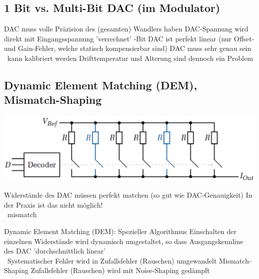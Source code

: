 \subsection{1 Bit vs. Multi-Bit DAC (im Modulator)}

\begin{outline}
    \1 DAC muss volle Präzision des (gesamten) Wandlers haben
        \2 DAC-Spannung wird direkt mit Eingangsspannung 'verrechnet'
    -Bit DAC ist perfekt linear (nur Offset- und Gain-Fehler, welche statisch kompensierbar sind)
    \1 DAC muss sehr genau sein \textrightarrow\ kann kalibriert werden
        \2 Drifttemperatur und Alterung sind dennoch ein Problem
\end{outline}


\subsection{Dynamic Element Matching (DEM), Mismatch-Shaping}

\begin{minipage}[c]{0.4\columnwidth}
    \includegraphics[width=\columnwidth]{images/strom-DAC.png}
\end{minipage}
\hfill
\begin{minipage}[c]{0.58\columnwidth}
    \begin{outline}
        \1 Widerstände des DAC müssen perfekt matchen (so gut wie DAC-Genauigkeit)
            \2 In der Praxis ist das nicht möglich!\\
                \textrightarrow\ mismatch
    \end{outline}
\end{minipage}

\vspace{0.2cm}

\begin{outline}
    \1 Dynamic Element Matching (DEM): Spezieller Algorithmus
        \2 Einschalten der einzelnen Widerstände wird dynamisch umgestaltet, so dass Ausgangskennline des DAC 
            'durchschnittlich linear' \\
            \textrightarrow\ Systematischer Fehler wird in Zufallsfehler (Rauschen) umgewandelt
    \1 Mismatch-Shaping 
        \2 Zufallsfehler (Rauschen) wird mit Noise-Shaping gedämpft
\end{outline}


